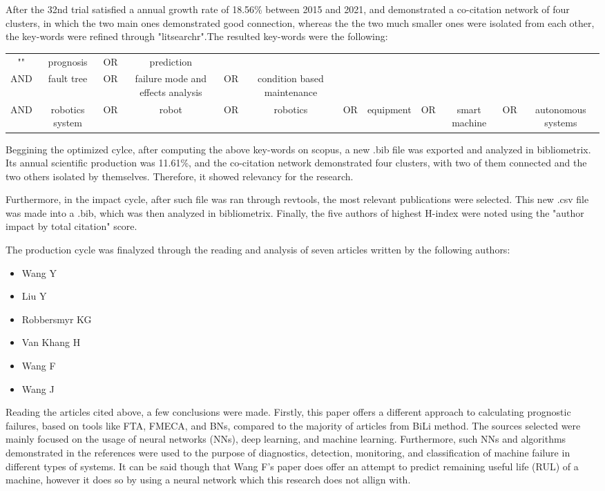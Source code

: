  After the 32nd trial satisfied a annual growth rate of 18.56\% between 2015 and 2021, and demonstrated a co-citation network of four clusters, in which the two main ones demonstrated good connection, whereas the the two much smaller ones were isolated from each other, the key-words were refined through "litsearchr".The resulted key-words were the following:

 \begin{center}
    \begin{tabular}{ c c c c c c c c c c c c }
        "" & prognosis & OR & prediction \\
        AND & fault tree & OR & failure mode and effects analysis & OR & condition based maintenance \\
        AND & robotics system & OR & robot & OR & robotics & OR &equipment & OR & smart machine & OR & autonomous systems
    \end{tabular}
\end{center}

Beggining the optimized cylce, after computing the above key-words on scopus, a new .bib file was exported and analyzed in bibliometrix. Its annual scientific production was 11.61\%, and the co-citation network demonstrated four clusters, with two of them connected and the two others isolated by themselves. Therefore, it showed relevancy for the research.

Furthermore, in the impact cycle, after such file was ran through revtools, the most relevant publications were selected. This new .csv file was made into a .bib, which was then analyzed in bibliometrix. Finally, the five authors of highest H-index were noted using the "author impact by total citation" score. 

The production cycle was finalyzed through the reading and analysis of seven articles written by the following authors:
\begin{itemize}
    \item Wang Y \cite{wang2018}
    \item Liu Y \cite{liu2021}
    \item Robbersmyr KG \cite{duo2018} \cite{senanayaka2018robust}
    \item Van Khang H \cite{duo2018} \cite{kudelina2021methods}
    \item Wang F \cite{YANG201927}
    \item Wang J \cite{wangj2020}
\end{itemize}

Reading the articles cited above, a few conclusions were made. Firstly, this paper offers a different approach to calculating prognostic failures, based on tools like FTA, FMECA, and BNs, compared to the majority of articles from BiLi method. The sources selected were mainly focused on the usage of neural networks (NNs), deep learning, and machine learning. Furthermore, such NNs and algorithms demonstrated in the references were used to the purpose of diagnostics, detection, monitoring, and classification of machine failure in different types of systems. It can be said though that Wang F's paper \cite{YANG201927} does offer an attempt to predict remaining useful life (RUL) of a machine, however it does so by using a neural network which this research does not allign with.

